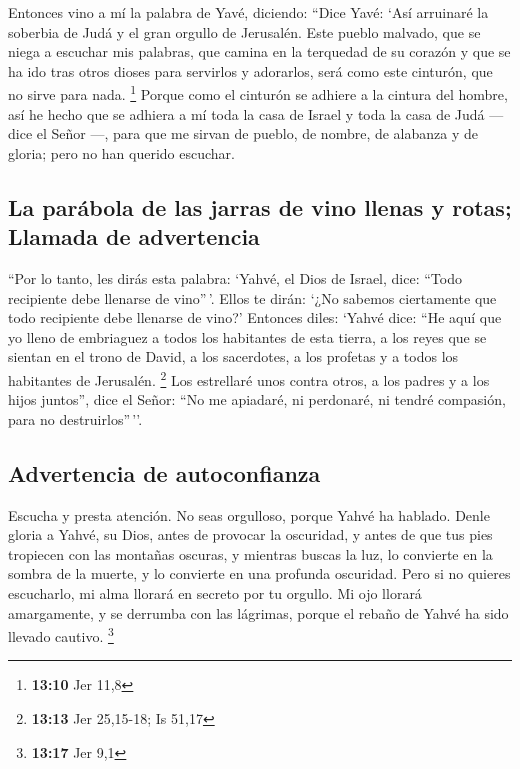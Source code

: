  Entonces vino a mí la palabra de Yavé, diciendo:
 ``Dice Yavé: `Así arruinaré la soberbia de Judá y el gran
orgullo de Jerusalén.  Este pueblo malvado, que se niega
a escuchar mis palabras, que camina en la terquedad de su corazón y que
se ha ido tras otros dioses para servirlos y adorarlos, será como este
cinturón, que no sirve para nada. \footnote{\textbf{13:10} Jer 11,8}
 Porque como el cinturón se adhiere a la cintura del
hombre, así he hecho que se adhiera a mí toda la casa de Israel y toda
la casa de Judá --- dice el Señor ---, para que me sirvan de pueblo, de
nombre, de alabanza y de gloria; pero no han querido escuchar.

\hypertarget{la-paruxe1bola-de-las-jarras-de-vino-llenas-y-rotas-llamada-de-advertencia}{%
\subsection{La parábola de las jarras de vino llenas y rotas; Llamada de
advertencia}\label{la-paruxe1bola-de-las-jarras-de-vino-llenas-y-rotas-llamada-de-advertencia}}

 ``Por lo tanto, les dirás esta palabra: `Yahvé, el Dios
de Israel, dice: ``Todo recipiente debe llenarse de vino''\,'. Ellos te
dirán: `¿No sabemos ciertamente que todo recipiente debe llenarse de
vino?'  Entonces diles: `Yahvé dice: ``He aquí que yo
lleno de embriaguez a todos los habitantes de esta tierra, a los reyes
que se sientan en el trono de David, a los sacerdotes, a los profetas y
a todos los habitantes de Jerusalén. \footnote{\textbf{13:13} Jer
  25,15-18; Is 51,17}  Los estrellaré unos contra otros,
a los padres y a los hijos juntos'', dice el Señor: ``No me apiadaré, ni
perdonaré, ni tendré compasión, para no destruirlos''\,''.

\hypertarget{advertencia-de-autoconfianza}{%
\subsection{Advertencia de
autoconfianza}\label{advertencia-de-autoconfianza}}

 Escucha y presta atención. No seas orgulloso, porque
Yahvé ha hablado.  Denle gloria a Yahvé, su Dios, antes
de provocar la oscuridad, y antes de que tus pies tropiecen con las
montañas oscuras, y mientras buscas la luz, lo convierte en la sombra de
la muerte, y lo convierte en una profunda oscuridad. 
Pero si no quieres escucharlo, mi alma llorará en secreto por tu
orgullo. Mi ojo llorará amargamente, y se derrumba con las lágrimas,
porque el rebaño de Yahvé ha sido llevado cautivo. \footnote{\textbf{13:17}
  Jer 9,1}

